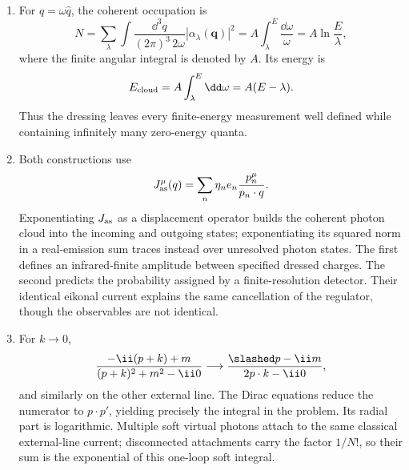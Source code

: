 \begin{enumerate}
\begin{enumerate}
\item
For \(q=\omega\widehat q\), the coherent occupation is
\[
 N=\sum_\lambda\int\frac{\dd^3q}{(2\pi)^3\,2\omega}
 |\alpha_\lambda(\mathbf q)|^2
 =A\int_\lambda^E\frac{\dd\omega}{\omega}
 =A\ln\frac E\lambda ,
\]
where the finite angular integral is denoted by \(A\).  Its energy is
\[
 E_{\rm cloud}=A\int_\lambda^E \dd\omega=A(E-\lambda).
\]
Thus the dressing leaves every finite-energy measurement well defined
while containing infinitely many zero-energy quanta.
\item
Both constructions use
\[
 J^\mu_{\rm as}(q)=\sum_n\eta_ne_n\frac{p_n^\mu}{p_n\cdot q}.
\]
Exponentiating \(J_{\rm as}\) as a displacement operator builds the coherent
photon cloud into the incoming and outgoing states; exponentiating its
squared norm in a real-emission sum traces instead over unresolved photon
states.  The first defines an infrared-finite amplitude between specified
dressed charges.  The second predicts the probability assigned by a
finite-resolution detector.  Their identical eikonal current explains the
same cancellation of the regulator, though the observables are not
identical.
\item
For \(k\to0\),
\[
 \frac{-\ii(\sl p+\sl k)+m}{(p+k)^2+m^2-\ii0}
 \longrightarrow \frac{\slashed p-\ii m}{2p\cdot k-\ii0},
\]
and similarly on the other external line.  The Dirac equations reduce the
numerator to \(p\cdot p'\), yielding precisely the integral in the problem.
Its radial part is logarithmic.  Multiple soft virtual photons attach to
the same classical external-line current; disconnected attachments carry
the factor \(1/N!\), so their sum is the exponential of this one-loop soft
integral.
\end{enumerate}


\end{enumerate}
